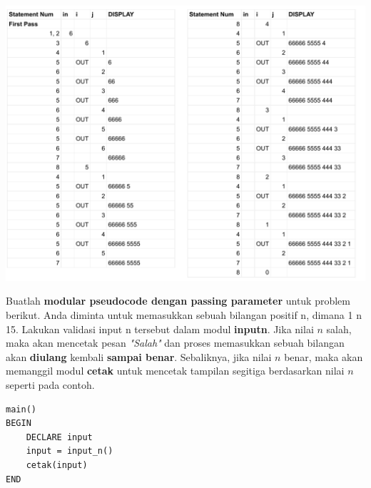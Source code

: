 \documentclass[
  11pt,
  answers  
]{exam}
\begin{document}
\begin{questions}
    \question
    \begin{solution}
      \includegraphics[clip, scale=0.85]{pdf/nomor2.pdf}
    \end{solution}
    \pagebreak
    
    \question
    Buatlah \textbf{modular pseudocode dengan passing parameter} untuk problem berikut. 
    Anda diminta untuk memasukkan sebuah bilangan positif n, dimana 1 n 15. Lakukan validasi input n tersebut dalam modul \textbf{inputn}.
    Jika nilai $n$ salah, maka akan mencetak pesan \emph{"Salah"} dan proses memasukkan sebuah bilangan akan \textbf{diulang} kembali \textbf{sampai benar}.
    Sebaliknya, jika nilai $n$ benar, maka akan memanggil modul \textbf{cetak} untuk mencetak tampilan segitiga berdasarkan nilai $n$ seperti pada contoh.

    \begin{solution}
      \begin{lstlisting}
main()
BEGIN
	DECLARE input
	input = input_n()
	cetak(input)
END	


\end{lstlisting}
\end{solution}
\end{questions}
\end{document}
